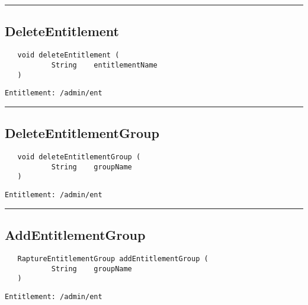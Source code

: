 \rule{12cm}{2pt}
\subsection{DeleteEntitlement}
\label{Api:DeleteEntitlement}
\begin{Verbatim}
   void deleteEntitlement (
           String    entitlementName
   )
\end{Verbatim}
\begin{Verbatim}[formatcom=\color{Maroon}]
  Entitlement: /admin/ent
\end{Verbatim}



\rule{12cm}{2pt}
\subsection{DeleteEntitlementGroup}
\label{Api:DeleteEntitlementGroup}
\begin{Verbatim}
   void deleteEntitlementGroup (
           String    groupName
   )
\end{Verbatim}
\begin{Verbatim}[formatcom=\color{Maroon}]
  Entitlement: /admin/ent
\end{Verbatim}



\rule{12cm}{2pt}
\subsection{AddEntitlementGroup}
\label{Api:AddEntitlementGroup}
\begin{Verbatim}
   RaptureEntitlementGroup addEntitlementGroup (
           String    groupName
   )
\end{Verbatim}
\begin{Verbatim}[formatcom=\color{Maroon}]
  Entitlement: /admin/ent
\end{Verbatim}



